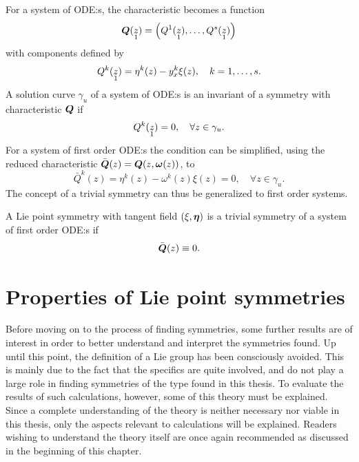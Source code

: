 For a system of ODE:s, the characteristic becomes a function
\begin{equation*}
  \vect{Q}(\prolong{z}{1}) = \left(Q^1(\prolong{z}{1}), \dots, Q^s(\prolong{z}{1})\right)
\end{equation*}
with components defined by
\begin{equation*}
  Q^k(\prolong{z}{1}) = \eta^k(z) - y^k_x \xi(z), \quad k = 1,\dots,s.
\end{equation*}
A solution curve \(\gamma_u\) of a system of ODE:s is an invariant of a symmetry with characteristic \(\vect{Q}\) if
\begin{equation*}
  Q^k(\prolong{z}{1}) = 0, \quad \forall z \in \gamma_u.
\end{equation*}
For a system of first order ODE:s  the condition can be simplified, using the reduced characteristic \(\bar{\vect{Q}}(z) = \vect{Q}(z, \vect{\omega}(z))\), to
\begin{equation*}
  \bar{Q}^k(z) = \eta^k(z) - \omega^k(z) \xi(z) = 0, \quad \forall z \in \gamma_u.
\end{equation*}
The concept of a trivial symmetry can thus be generalized to first order systems.
\begin{defn} \label{defn:trivial-symmetry}
  A Lie point symmetry with tangent field \(\left(\xi, \vect{\eta}\right)\) is a trivial symmetry of a system of first order ODE:s  if
  \begin{equation*}
    \bar{\vect{Q}}(z) \equiv 0.
  \end{equation*}
\end{defn}

\section{Properties of Lie point symmetries} \label{sec:lie-point-properties}

Before moving on to the process of finding symmetries, some further results are of interest in order to better understand and interpret the symmetries found.
Up until this point, the definition of a Lie group has been consciously avoided.
This is mainly due to the fact that the specifics are quite involved, and do not play a large role in finding symmetries of the type found in this thesis.
To evaluate the results of such calculations, however, some of this theory must be explained.
Since a complete understanding of the theory is neither necessary nor viable in this thesis, only the aspects relevant to calculations will be explained.
Readers wishing to understand the theory itself are once again recommended \cite{olver1993applications,olver1995equivalence} as discussed in the beginning of this chapter.

